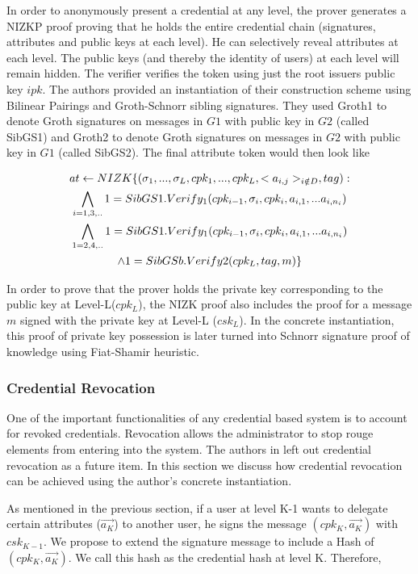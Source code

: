 \documentclass[journal]{IEEEtran}
\begin{document}
In order to anonymously present a credential at any level, the prover generates a NIZKP proof proving that he holds the entire credential chain (signatures, attributes and public keys at each level). He can selectively reveal attributes at each level. The public keys (and thereby the identity of users) at each level will remain hidden. The verifier verifies the token using just the root issuers public key $ipk$. The authors provided an instantiation of their construction scheme using Bilinear Pairings and Groth-Schnorr sibling signatures. They used Groth1 to denote Groth signatures on messages in $G1$ with public key in $G2$ (called SibGS1) and Groth2 to denote Groth signatures on messages in $G2$ with public key in $G1$ (called SibGS2). The final attribute token would then look like

\begin{multline}
$$
at \leftarrow NIZK \lbrace(\sigma_1,...,\sigma_L,cpk_1,...,cpk_L,<a_{i,j}>_{i \notin D},tag) : \\ 
\bigwedge \limits _{i=1,3,..} 1 = SibGS1.Verify_1(cpk_{i-1}, \sigma_i,cpk_i,a_{i,1},...a_{i,n_i})\\
\bigwedge \limits _{1=2,4,..} 1 = SibGS1.Verify_1(cpk_{i-1}, \sigma_i,cpk_i,a_{i,1},...a_{i,n_i})\\
\wedge 1 = SibGSb.Verify2(cpk_L,tag,m)\rbrace
$$
\end{multline}

In order to prove that the prover holds the private key corresponding to the public key at Level-L($cpk_L$), the NIZK proof also includes the proof for a message $m$ signed with the private key at Level-L ($csk_L$). In the concrete instantiation, this proof of private key possession is later turned into Schnorr signature proof of knowledge using Fiat-Shamir heuristic.

\subsubsection{Credential Revocation} \label{revoke}
One of the important functionalities of any credential based system is to account for revoked credentials. Revocation allows the administrator to stop rouge elements from entering into the system. The authors in \citep{CamenischDD17} left out credential revocation as a future item. In this section we discuss how credential revocation can be achieved using the author's concrete instantiation.

As mentioned in the previous section, if a user at level K-1 wants to delegate certain attributes ($\overrightarrow{a_K}$) to another user, he signs the message $(cpk_K,\overrightarrow{a_K})$ with $csk_{K-1}$. We propose to extend the signature message to include a Hash of $(cpk_K , \overrightarrow{a_K})$. We call this hash as the credential hash at level K. Therefore,
\end{document}

